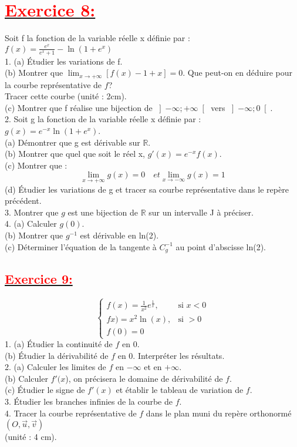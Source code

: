 \documentclass[12pt]{article}
\begin{document}
\section*{\underline{\textbf{\textcolor{red}{Exercice 8: }}}}
Soit f la fonction de la variable réelle x définie par :\\
$f(x)=\frac{e^{x}}{e^{x}+1}-\ln(1+e^{x})$\\
1. (a) Étudier les variations de f.\\
(b) Montrer que $\lim_{x \to +\infty} \left[f(x)-1+x \right]=0$. Que peut-on en déduire pour la courbe représentative de $f$?\\
Tracer cette courbe (unité : 2cm).\\
(c) Montrer que f réalise une bijection de $ \left] -\infty ; +\infty \right[ $
vers $\left] -\infty ; 0\right[ $.\\
2. Soit g la fonction de la variable réelle x définie par :\\
$g(x)=e^{-x}\ln(1+e^{x})$.\\
(a) Démontrer que g est dérivable sur $\mathbb{R}$.\\
(b) Montrer que quel que soit le réel x, $g'(x)=e^{-x}f(x)$.\\
(c) Montrer que :\[\lim_{x \to +\infty}g(x)=0\quad et \lim_{x \to -\infty}g(x)=1\]
(d) Étudier les variations de g et tracer sa courbe représentative dans le repère précédent.\\
3. Montrer que $g$ est une bijection de $\mathbb{R}$ sur un intervalle J à préciser.\\
4. (a) Calculer $g(0)$.\\
(b) Montrer que $g^{-1}$ est dérivable en ln(2).\\
(c) Déterminer l’équation de la tangente à $C^{-1}_{g}$ au point d’abscisse ln(2).
\subsection*{\underline{\textbf{\textcolor{red}{Exercice 9:}}}}
\[ \begin{cases} 
  f(x)=\frac{1}{x^{2}}e^{\frac{1}{x}}, & \text{si } x < 0 \\
  fx)=x^{2}\ln(x), & \text{si } > 0 \\
  f(0)=0
\end{cases} \]
1. (a) Étudier la continuité de $f$ en 0.\\
(b) Étudier la dérivabilité de $f$ en 0. Interpréter les
résultats.\\
2. (a) Calculer les limites de $f$ en $-\infty$ et en $+\infty$.\\
(b) Calculer $f'(x$), on précisera le domaine de dérivabilité de $f$.\\
(c) Étudier le signe de $f'(x)$ et établir le tableau de variation de $f$.\\
3. Étudier les branches infinies de la courbe de $f$.\\
4. Tracer la courbe représentative de $f$ dans le plan muni du repère orthonormé 
$(O,\vec{u},\vec{v})$\\ (unité : 4 cm).\\
\end{document}
